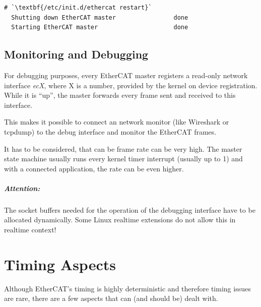 \documentclass[a4paper,12pt,BCOR6mm,bibtotoc,idxtotoc]{scrbook}
\begin{document}
\begin{lstlisting}[gobble=2]
  # `\textbf{/etc/init.d/ethercat restart}`
  Shutting down EtherCAT master                done
  Starting EtherCAT master                     done
\end{lstlisting}


\section{Monitoring and Debugging}
\label{sec:debug}


For debugging purposes, every EtherCAT master registers a read-only network
interface \textit{ecX}, where X is a number, provided by the kernel on device
registration. While it is ``up'', the master forwards every frame sent and
received to this interface.

This makes it possible to connect an network monitor (like Wireshark or
tcpdump) to the debug interface and monitor the EtherCAT frames.

It has to be considered, that can be frame rate can be very high. The master
state machine usually runs every kernel timer interrupt (usually up to
\unit{1}{\kilo\hertz}) and with a connected application, the rate can be even
higher.

\paragraph{Attention:} The socket buffers needed for the operation of
the debugging interface have to be allocated dynamically. Some Linux
realtime extensions do not allow this in realtime context!


\chapter{Timing Aspects}
\label{sec:timing}

Although EtherCAT's timing is highly deterministic and therefore timing issues
are rare, there are a few aspects that can (and should be) dealt with.

\end{document}
